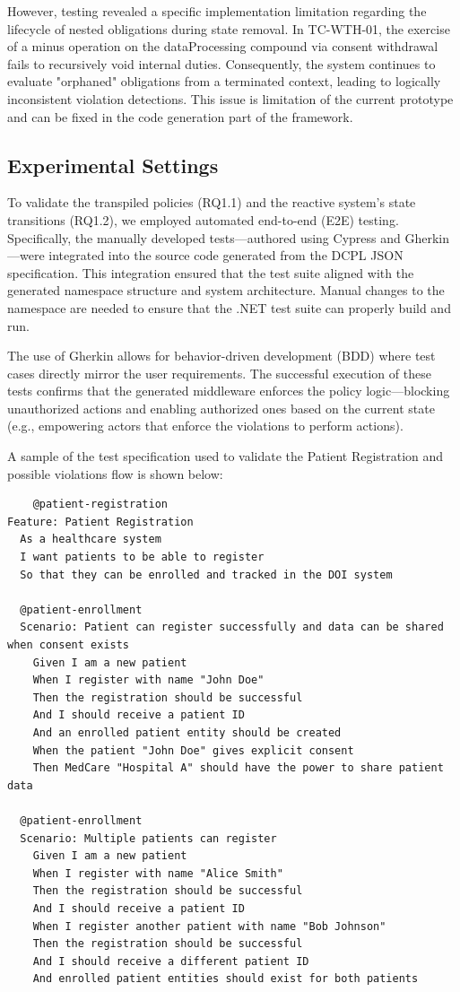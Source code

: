 However, testing revealed a specific implementation limitation regarding the lifecycle of nested obligations during state removal. In TC-WTH-01, the exercise of a minus operation on the dataProcessing compound via consent withdrawal fails to recursively void internal duties. Consequently, the system continues to evaluate "orphaned" obligations from a terminated context, leading to logically inconsistent violation detections. This issue is limitation of the current prototype and can be fixed in the code generation part of the framework.


\subsection{Experimental Settings}

To validate the transpiled policies (RQ1.1) and the reactive system's state transitions (RQ1.2), we employed automated end-to-end (E2E) testing. Specifically, the manually developed tests—authored using Cypress and Gherkin—were integrated into the source code generated from the DCPL JSON specification. This integration ensured that the test suite aligned with the generated namespace structure and system architecture. Manual changes to the namespace are needed to ensure that the .NET test suite can properly build and run. 

The use of Gherkin \cite{GherkinDocs} allows for behavior-driven development (BDD) \cite{bruschi2019behaviorgherkin} where test cases directly mirror the user requirements. The successful execution of these tests confirms that the generated middleware enforces the policy logic—blocking unauthorized actions and enabling authorized ones based on the current state (e.g., empowering actors that enforce the violations to perform actions).

A sample of the test specification used to validate the Patient Registration and possible violations flow is shown below:

\begin{verbatim}
    @patient-registration
Feature: Patient Registration
  As a healthcare system
  I want patients to be able to register
  So that they can be enrolled and tracked in the DOI system

  @patient-enrollment
  Scenario: Patient can register successfully and data can be shared when consent exists
    Given I am a new patient
    When I register with name "John Doe"
    Then the registration should be successful
    And I should receive a patient ID
    And an enrolled patient entity should be created
    When the patient "John Doe" gives explicit consent
    Then MedCare "Hospital A" should have the power to share patient data

  @patient-enrollment
  Scenario: Multiple patients can register
    Given I am a new patient
    When I register with name "Alice Smith"
    Then the registration should be successful
    And I should receive a patient ID
    When I register another patient with name "Bob Johnson"
    Then the registration should be successful
    And I should receive a different patient ID
    And enrolled patient entities should exist for both patients
\end{verbatim}


